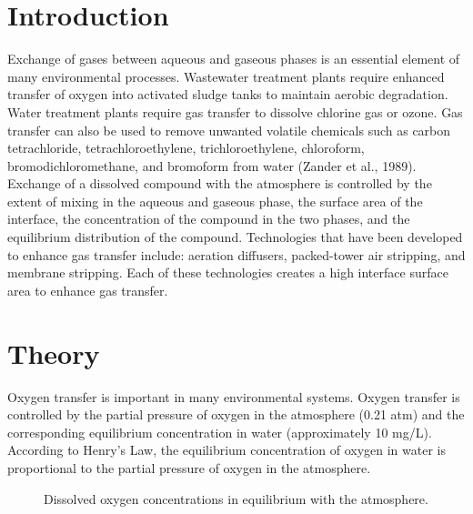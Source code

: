 \documentclass[letterpaper,10pt,english]{sphinxmanual}
\let\sphinxpxdimen\pdfpxdimen\else\newdimen\sphinxpxdimen
\begin{document}
\section{Introduction}
\label{\detokenize{Gas_Transfer/Gas_Transfer:introduction}}\label{\detokenize{Gas_Transfer/Gas_Transfer:heading-gas-transfer-introduction}}
Exchange of gases between aqueous and gaseous phases is an essential element of many environmental processes. Wastewater treatment plants require enhanced transfer of oxygen into activated sludge tanks to maintain aerobic degradation. Water treatment plants require gas transfer to dissolve chlorine gas or ozone. Gas transfer can also be used to remove unwanted volatile chemicals such as carbon tetrachloride, tetrachloroethylene, trichloroethylene, chloroform, bromodichloromethane, and bromoform from water (Zander et al., 1989). Exchange of a dissolved compound with the atmosphere is controlled by the extent of mixing in the aqueous and gaseous phase, the surface area of the interface, the concentration of the compound in the two phases, and the equilibrium distribution of the compound. Technologies that have been developed to enhance gas transfer include: aeration diffusers, packed-tower air stripping, and membrane stripping. Each of these technologies creates a high interface surface area to enhance gas transfer.


\section{Theory}
\label{\detokenize{Gas_Transfer/Gas_Transfer:theory}}\label{\detokenize{Gas_Transfer/Gas_Transfer:heading-gas-transfer-theory}}
Oxygen transfer is important in many environmental systems. Oxygen transfer is controlled by the partial pressure of oxygen in the atmosphere (0.21 atm) and the corresponding equilibrium concentration in water (approximately 10 mg/L). According to Henry’s Law, the equilibrium concentration of oxygen in water is proportional to the partial pressure of oxygen in the atmosphere.

\begin{figure}[htbp]
\centering
\capstart

\noindent\sphinxincludegraphics[width=300\sphinxpxdimen]{{Oxygen_vs_T}.png}
\caption{Dissolved oxygen concentrations in equilibrium with the atmosphere.}\label{\detokenize{Gas_Transfer/Gas_Transfer:id2}}\label{\detokenize{Gas_Transfer/Gas_Transfer:figure-oxygen-vs-t}}\end{figure}
\end{document}
